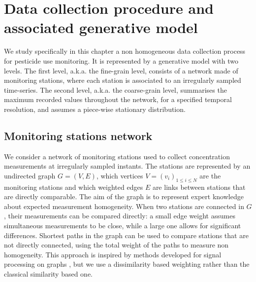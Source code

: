 
\section{Data collection procedure and associated generative model}\label{section:data:model}

We study specifically in this chapter a non homogeneous data collection process for pesticide use monitoring. It is represented by a generative model with two levels. The first level, a.k.a. the fine-grain level, consists of a network made of monitoring stations, where each station is associated to an irregularly sampled time-series. The second level, a.k.a. the coarse-grain level, summarises the maximum recorded values throughout the network, for a specified temporal resolution, and assumes a piece-wise stationary distribution. 

\subsection{Monitoring stations network}\label{subsection:graph}

We consider a network of monitoring stations used to collect concentration measurements at irregularly sampled instants. The stations are represented by an undirected graph $G=(V, E)$, which vertices $V=(v_i)_{1\leq i\leq N}$ are the monitoring stations and which weighted edges $E$ are links between stations that are directly comparable. The aim of the graph is to represent expert knowledge about expected measurement homogeneity. When two stations are connected in $G$, their measurements can be compared directly: a small edge weight assumes simultaneous measurements to be close, while a large one allows for significant differences. Shortest paths in the graph can be used to compare stations that are not directly connected, using the total weight of the paths to measure non homogeneity. This approach is inspired by methods developed for signal processing on graphs \cite{6494675}, but we use a dissimilarity based weighting rather than the classical similarity based one. 

